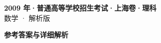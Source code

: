 \documentclass[zihao=-4, a4paper]{ctexart}
\begin{document}
\begin{center}
  {\Large\bfseries 2009 年·普通高等学校招生考试·上海卷·理科}\\[4pt]
  {\large 数学 · 解析版}
\end{center}
\medskip
{}

\clearpage
{}
\begin{center}{\Large\bfseries 参考答案与详细解析}\end{center}
\medskip

\end{document}
